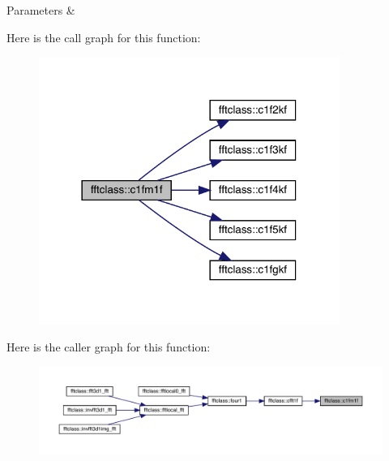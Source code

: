 \begin{DoxyParams}{Parameters}
{\em } & \\
\hline
\end{DoxyParams}
Here is the call graph for this function\+:\nopagebreak
\begin{figure}[H]
\begin{center}
\leavevmode
\includegraphics[width=278pt]{namespacefftclass_a8870afa6b2bab24460d719026aa6e0d8_cgraph}
\end{center}
\end{figure}
Here is the caller graph for this function\+:\nopagebreak
\begin{figure}[H]
\begin{center}
\leavevmode
\includegraphics[width=350pt]{namespacefftclass_a8870afa6b2bab24460d719026aa6e0d8_icgraph}
\end{center}
\end{figure}
\mbox{\label{namespacefftclass_ad484b97b5f8fc5ab868f25d7be0de7f8}} 
